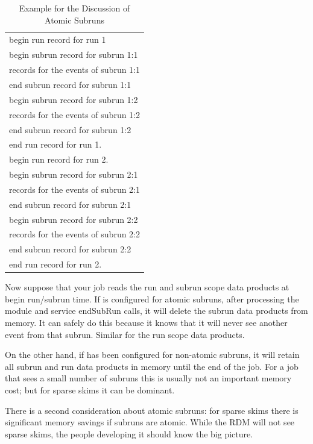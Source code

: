 \begin{table}
\begin{center}
\caption[Example For Discussion of Atomic Subruns]{Example for the Discussion of Atomic Subruns}
\label{tab:atomicsubruns}
\begin{tabular}{l}\hline
  begin run record for run 1 \\
  begin subrun record for subrun 1:1 \\
  records for the events of subrun 1:1 \\
  end subrun record for subrun 1:1 \\
   begin subrun record for subrun 1:2 \\
   records for the events of subrun 1:2 \\
   end subrun record for subrun 1:2 \\
   end run record for run 1. \\ \hline
   begin run record for run 2. \\
   begin subrun record for subrun 2:1 \\
   records for the events of subrun 2:1 \\
   end subrun record for subrun 2:1 \\
   begin subrun record for subrun 2:2 \\
   records for the events of subrun 2:2 \\
   end subrun record for subrun 2:2 \\
   end run record for run 2. \\
   \hline
  \end{tabular}
\end{center}
\end{table}

Now suppose that your job reads the run and subrun scope data products at begin run/subrun time.
If \art is configured for atomic subruns, after processing the module and service
{\code endSubRun} calls, it will delete the subrun data products from memory. It can safely do this
because it knows that it will never see another event from that subrun.
Similar for the run scope data products.

On the other hand, if \art has been configured for non-atomic subruns, it will retain all subrun
and run data products in memory until the end of the job.
For a job that sees a small number of subruns this is usually not an important memory cost; but
for sparse skims it can be dominant.


There is a second consideration about atomic subruns:
for sparse skims there is significant memory savings if subruns are atomic.
While the RDM will not see sparse skims, the people developing it should know the big picture.


